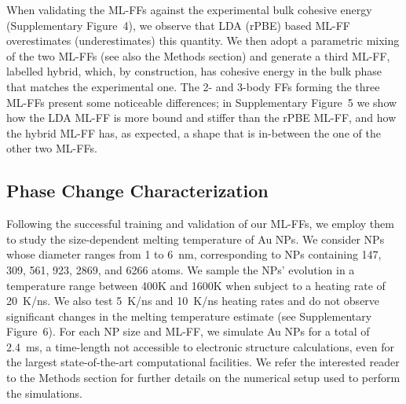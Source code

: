 \documentclass[%
aip,
 amsmath,amssymb,
 reprint,
]{revtex4-1}
\begin{document}
When validating the ML-FFs against the experimental bulk cohesive energy (Supplementary Figure~4), we observe that LDA (rPBE) based ML-FF overestimates (underestimates) this quantity.
%
We then adopt a parametric mixing of the two ML-FFs (see also the Methods section) and generate a third ML-FF, labelled hybrid, which, by construction, has cohesive energy in the bulk phase that matches the experimental one.
%
The 2- and 3-body FFs forming the three ML-FFs present some noticeable differences; in Supplementary Figure~5 we show how the LDA ML-FF is more bound and stiffer than the rPBE ML-FF, and how the hybrid ML-FF has, as expected, a shape that is in-between the one of the other two ML-FFs.

\subsection*{Phase Change Characterization}
\label{subsec:phase_change_results}

Following the successful training and validation of our ML-FFs, we employ them to study the size-dependent melting temperature of Au NPs. 
%
We consider NPs whose diameter ranges from 1 to 6~nm, corresponding to NPs containing 147, 309, 561, 923, 2869, and 6266 atoms.
%
We sample the NPs' evolution in a temperature range between 400K and 1600K when subject to a heating rate of 20~K/ns.
%
We also test 5~K/ns and 10~K/ns heating rates and do not observe significant changes in the melting temperature estimate (see Supplementary Figure~6).
%
For each NP size and ML-FF, we simulate Au NPs for a total of 2.4~ms, a time-length not accessible to electronic structure calculations, even for the largest state-of-the-art computational facilities.
%
We refer the interested reader to the Methods section for further details on the numerical setup used to perform the simulations.
\end{document}
